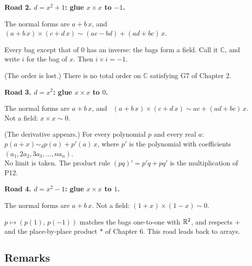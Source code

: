\textbf{Road 2. $d = x^2 + 1$: glue $x \times x$ to $-1$.}
\begin{lines}
\item[\lab{P11}] The normal forms are $a + b\,x$, and \ $(a + b\,x) \times (c + d\,x) \sim (ac - bd) + (ad + bc)\,x$.
\item[\lab{T5}] Every bag except that of $0$ has an inverse: the bags form a field. Call it $\mathbb{C}$, and write $i$ for the bag of $x$. Then $i \times i = -1$.
\item[\lab{T6}] (The order is lost.) There is no total order on $\mathbb{C}$ satisfying G7 of Chapter 2.
\end{lines}

\textbf{Road 3. $d = x^2$: glue $x \times x$ to $0$.}
\begin{lines}
\item[\lab{P12}] The normal forms are $a + b\,x$, and \ $(a + b\,x) \times (c + d\,x) \sim ac + (ad + bc)\,x$. Not a field: $x \times x \sim 0$.
\item[\lab{T7}] (The derivative appears.) For every polynomial $p$ and every real $a$: \ $p(a + x) \sim_d p(a) + p'(a)\,x$, where $p'$ is the polynomial with coefficients $(a_1, 2a_2, 3a_3, \dots, n a_n)$. \\
No limit is taken. The product rule $(pq)' = p'q + pq'$ is the multiplication of P12.
\end{lines}

\textbf{Road 4. $d = x^2 - 1$: glue $x \times x$ to $1$.}
\begin{lines}
\item[\lab{P13}] The normal forms are $a + b\,x$. Not a field: $(1 + x) \times (1 - x) \sim 0$.
\item[\lab{T8}] $p \mapsto (p(1),\, p(-1))$ matches the bags one-to-one with $\mathbb{R}^2$, and respects $+$ and the place-by-place product $\ast$ of Chapter 6. This road leads back to arrays.
\end{lines}

\subsection*{Remarks}

